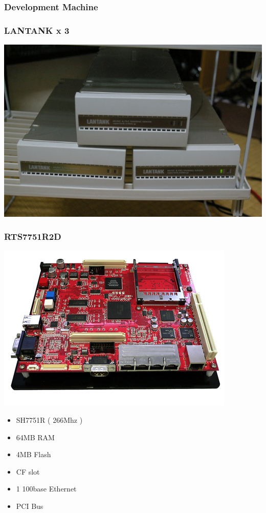 \documentclass[cjk,dvipdfm,12pt]{beamer}
\begin{document}
\begin{frame}
 \frametitle{Development Machine}
\end{frame}

\begin{frame}
 \frametitle{LANTANK x 3}
  \begin{center}
  \includegraphics[width=0.7\hsize]{image200705/lantank01.jpg}
  \end{center}
\end{frame}

\begin{frame}
 \frametitle{RTS7751R2D}
 \begin{minipage}[t]{0.4\hsize}
  \includegraphics[width=1.0\hsize]{image200705/r2d.jpg}
 \end{minipage} 
 \begin{minipage}[t]{0.5\hsize}
  \begin{itemize}
   \item SH7751R ( 266Mhz )
   \item 64MB RAM
   \item 4MB Flash 
   \item CF slot 
   \item 1 100base Ethernet
   \item PCI Bus 
  \end{itemize}
 \end{minipage}
\end{frame}
\end{document}
